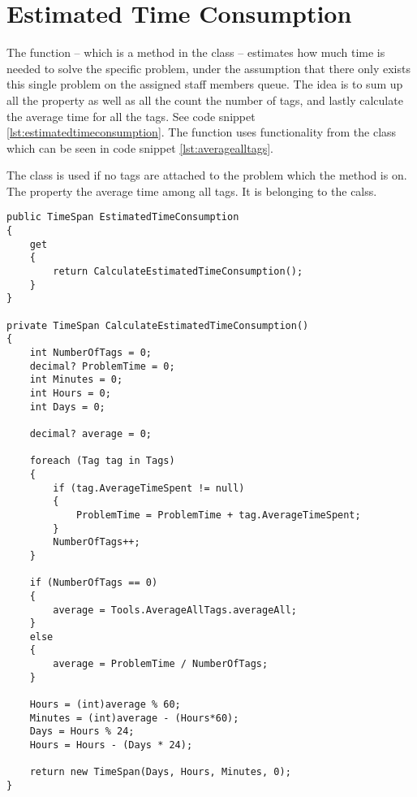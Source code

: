 \section{Estimated Time Consumption}
\label{sec:estimated_time_consumption}

The  function -- which is a method in the  class -- estimates how much time is needed to solve the specific problem, under the assumption that there only exists this single problem on the assigned staff members queue. The idea is to sum up all the  property as well as all the count the number of tags, and lastly calculate the average time for all the tags. See code snippet \ref{lst:estimatedtimeconsumption}. The  function uses functionality from the  class which can be seen in code snippet \ref{lst:averagealltags}.

The  class is used if no tags are attached to the problem which the  method is on.
The property  the average time among all tags.
It is belonging to the  calss.

\begin{lstlisting}[style=sourceCode, caption=\myCaption{The ManageTagTimes method. In lines one to seven a property is shown, which wraps the method in lines nine to forty-three.}, label=lst:estimatedtimeconsumption]
public TimeSpan EstimatedTimeConsumption
{
    get
    {
        return CalculateEstimatedTimeConsumption();
    }
}

private TimeSpan CalculateEstimatedTimeConsumption()
{
    int NumberOfTags = 0;
    decimal? ProblemTime = 0;
    int Minutes = 0;
    int Hours = 0;
    int Days = 0;

    decimal? average = 0;

    foreach (Tag tag in Tags)
    {
        if (tag.AverageTimeSpent != null)
        {
            ProblemTime = ProblemTime + tag.AverageTimeSpent;
        }
        NumberOfTags++;
    }

    if (NumberOfTags == 0)
    {
        average = Tools.AverageAllTags.averageAll;
    }
    else
    {
        average = ProblemTime / NumberOfTags;
    }

    Hours = (int)average % 60;
    Minutes = (int)average - (Hours*60);
    Days = Hours % 24;
    Hours = Hours - (Days * 24);

    return new TimeSpan(Days, Hours, Minutes, 0);
}
\end{lstlisting}

